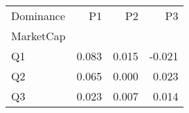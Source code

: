\begin{tabular}{lrrr}
\toprule
Dominance & P1 & P2 & P3 \\
MarketCap &  &  &  \\
\midrule
Q1 & 0.083 & 0.015 & -0.021 \\
Q2 & 0.065 & 0.000 & 0.023 \\
Q3 & 0.023 & 0.007 & 0.014 \\
\bottomrule
\end{tabular}
